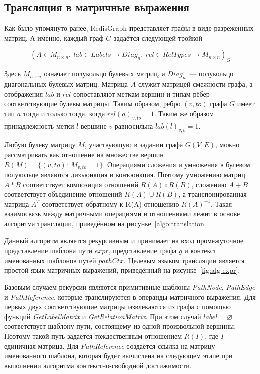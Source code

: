 \newpage
\subsection{Трансляция в матричные выражения}
Как было упомянуто ранее, RedisGraph представляет графы в виде разреженных матриц. А именно, каждый граф $G$ задаётся следующей тройкой

\[
(A \in M_{n\times n},~lab \in Labels \rightarrow Diag_n,~rel \in RelTypes \rightarrow M_{n \times n})_G
\]

Здесь $M_{n \times n}$ означает полукольцо булевых матриц, а $Diag_n$~--- полукольцо диагональных булевых матриц. Матрица $A$ служит матрицей смежности графа, а отображения $lab$ и $rel$ сопоставляют меткам вершин и типам рёбер соответствующие булевы матрицы. Таким образом, ребро $(v, to)$ графа $G$ имеет тип $a$ тогда и только тогда, когда $rel(a)_{v,to} = 1$.  Таким же образом принадлежность метки $l$ вершине $v$ равносильна $lab(l)_{v,v}=1$.

Любую булеву матрицу $M$, участвующую в задании графа $G(V, E)$, можно рассматривать как отношение на множестве вершин $R(M) = \{(v, to):~M_{v,to}=1\}$. Операциями сложения и умножения в булевом полукольце являются дизъюнкция и конъюнкция. Поэтому умножению матриц $A*B$ соответствует композиция отношений $R(A) \circ R(B)$, сложению $A+B$ соответствует объединение отношений $R(A) \cup R(B)$, а транспонированная матрица $A^T$ соответствует обратному к R(A) отношению $R(A)^{-1}$. Такая взаимосвязь между матричными операциями и отношениями лежит в основе алгоритма трансляции, приведённом на рисунке~\ref{algo:translation}.

Данный алгоритм является рекурсивным и принимает на вход промежуточное представление шаблона пути $expr$, представление графа $g$ и контекст именованных шаблонов путей $pathCtx$. Целевым языком трансляции является простой язык матричных выражений, приведённый на рисунке~\ref{fig:alg-expr}.

Базовым случаем рекурсии являются примитивные шаблоны \textit{Path\-Node}, \textit{PathEdge} и \textit{PathReference}, которые транслируются в операнды матричного выражения. Для первых двух соответствующие матрицы извлекаются из графа с помощью функций \textit{GetLabel\-Matrix} и \textit{GetRelation\-Matrix}. При этом случай $label = \varnothing$ соответствует шаблону пути, состоящему из одной произвольной вершины. Поэтому такой путь задаётся тождественным отношением $R(I)$, где $I$~--- единичная матрица. Для \textit{Path\-Reference} создаётся ссылка на матрицу именованного шаблона, которая будет вычислена на следующем этапе при выполнении алгоритма контекстно-свободной достижимости.

